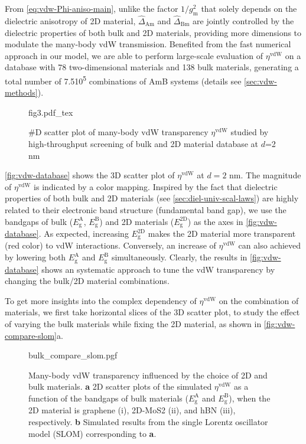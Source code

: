 From \autoref{eq:vdw-Phi-aniso-main}, unlike the factor
\(1/g_{\mathrm{m}}^{2}\) that solely depends on the dielectric
anisotropy of 2D material, \(\hat{\Delta}_{\mathrm{Am}}\) and
\(\hat{\Delta}_{\mathrm{Bm}}\) are jointly controlled by the
dielectric properties of both bulk and 2D materials, providing more
dimensions to modulate the many-body vdW transmission.
%
Benefited from
the fast numerical approach in our model, we are able to perform
large-scale evaluation of $\eta^{\mathrm{vdW}}$ on a database with
78 two-dimensional materials and 138 bulk materials, generating a total number of
7.5\texttimes{}10\textsuperscript{5} combinations of AmB systems
(details see \autoref{sec:vdw-methods}).
%
\begin{figure}[!htbp]
  \centering{}
  {fig3.pdf_tex}
  \caption{\label{fig:vdw-database} %
    #D scatter plot of many-body vdW transparency
    $\eta^{\mathrm{vdW}}$ studied by high-throughput screening of bulk
    and 2D material database at $d$=2 nm}
\end{figure}

\autoref{fig:vdw-database} shows the 3D scatter plot of
\(\eta^{\mathrm{vdW}}\) at \(d=2\) nm. The magnitude of
$\eta^{\mathrm{vdW}}$ is indicated by a color mapping.
%
Inspired by the fact that dielectric properties of both bulk
\cite{Moss_1950} and 2D materials (see
\autoref{sec:diel-univ-scal-laws}) are highly related to their
electronic band structure (\ie fundamental band gap), we use the
bandgaps of bulk (\(E_{\mathrm{g}}^{\mathrm{A}}\),
\(E_{\mathrm{g}}^{\mathrm{B}}\)) and 2D materials
(\(E_{\mathrm{g}}^{\mathrm{2D}}\)) as the axes in
\autoref{fig:vdw-database}.
%
As expected, increasing \(E_{\mathrm{g}}^{\mathrm{2D}}\) makes the 2D
material more transparent (red color) to vdW interactions.
%
Conversely, an increase of \(\eta^{\mathrm{vdW}}\) can also achieved
by lowering both \(E_{\mathrm{g}}^{\mathrm{A}}\) and
\(E_{\mathrm{g}}^{\mathrm{B}}\) simultaneously.
%
Clearly, the results in \autoref{fig:vdw-database} shows an systematic
approach to tune the vdW transparency by changing the bulk/2D material
combinations.


To get more insights into the complex dependency of
\(\eta^{\mathrm{vdW}}\) on the combination of materials, we first take
horizontal slices of the 3D scatter plot, to study the effect of
varying the bulk materials while fixing the 2D material, as shown in
\autoref{fig:vdw-compare-slom}a.
%
\begin{figure}[h!]
  \centering{}
  {bulk_compare_slom.pgf}
  \caption{\label{fig:vdw-compare-slom}%
    Many-body vdW transparency influenced by the choice of 2D and bulk
    materials. \textbf{a} 2D scatter plots of the simulated
    $\eta^{\mathrm{vdW}}$ as a function of the bandgaps of bulk
    materials ($E_{\mathrm{g}}^{\mathrm{A}}$ and
    $E_{\mathrm{g}}^{\mathrm{B}}$), when the 2D material is graphene
    (i), 2D-MoS2 (ii), and hBN (iii), respectively.  \textbf{b}
    Simulated results from the single Lorentz oscillator model (SLOM)
    corresponding to \textbf{a}.}
\end{figure}
%

